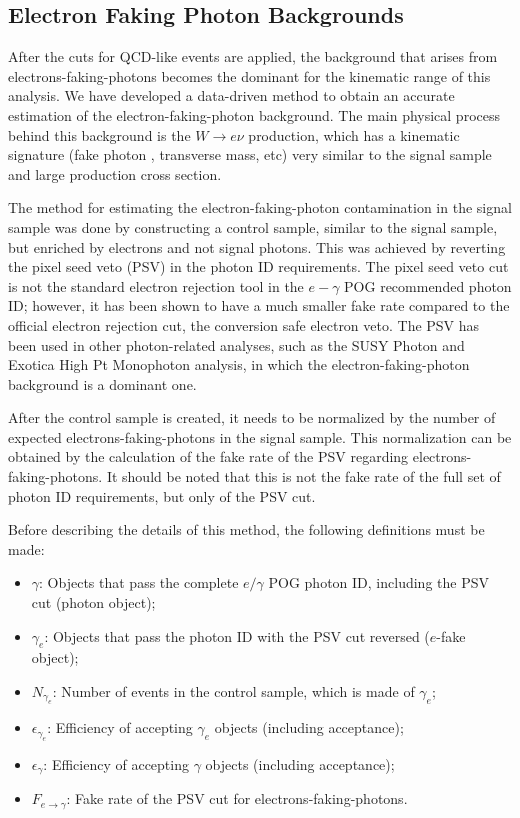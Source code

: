\subsection{Electron Faking Photon Backgrounds}
\label{sec:ewk}

After the cuts for QCD-like events are applied, the background that arises from electrons-faking-photons becomes the dominant for the kinematic range of this analysis. We have developed a data-driven method to obtain an accurate estimation of the electron-faking-photon background.
The main physical process behind this background is the $W\rightarrow e \nu$ production, which has a kinematic signature (fake photon \et, transverse mass, etc) very similar to the signal sample and large production cross section.

The method for estimating the electron-faking-photon contamination in the signal sample was done by constructing a control sample, similar to the signal sample, but enriched by electrons and not signal photons. This was achieved by reverting the pixel seed veto (PSV) in the photon ID requirements. The pixel seed veto cut is not the standard electron rejection tool in the $e-\gamma$ POG recommended photon ID; however, it has been shown to have a much smaller fake rate compared to the official electron rejection cut, the conversion safe electron veto. The PSV has been used in other photon-related analyses, such as the SUSY Photon and Exotica High Pt Monophoton analysis, in which the electron-faking-photon background is a dominant one.

After the control sample is created, it needs to be normalized by the number of expected electrons-faking-photons in the signal sample. This normalization can be obtained by the calculation of the fake rate of the PSV regarding electrons-faking-photons. It should be noted that this is not the fake rate of the full set of photon ID requirements, but only of the PSV cut. 

Before describing the details of this method, the following definitions must be made:

\begin{itemize}
\item $\gamma$: Objects that pass the complete $e/\gamma$ POG photon ID, including the PSV cut (photon object);
\item $\gamma_e$: Objects that pass the photon ID with the PSV cut reversed ($e$-fake object);
\item $N_{\gamma_e}$: Number of events in the control sample, which is made of $\gamma_e$;
\item $\epsilon_{\gamma_e}$: Efficiency of accepting $\gamma_e$ objects (including acceptance);
\item $\epsilon_{\gamma}$: Efficiency of accepting $\gamma$ objects (including acceptance);
\item $F_{e\rightarrow\gamma}$: Fake rate of the PSV cut for electrons-faking-photons.
\end{itemize}

